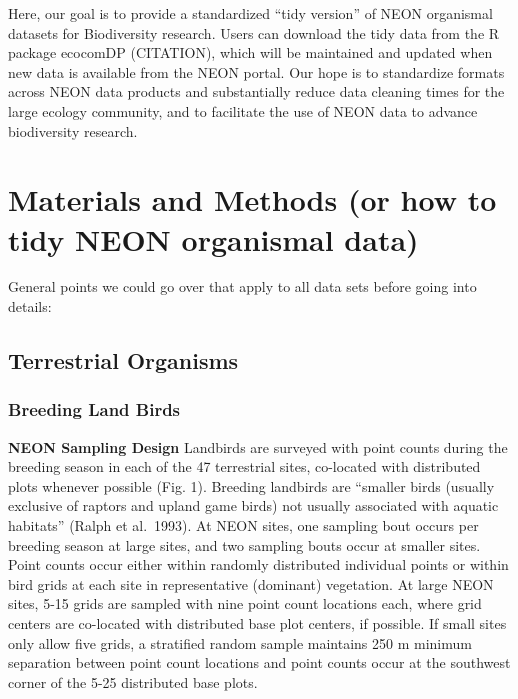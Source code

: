 \documentclass[
  12pt,
]{article}
\begin{document}
Here, our goal is to provide a standardized ``tidy version'' of NEON organismal datasets for Biodiversity research. Users can download the tidy data from the R package ecocomDP (CITATION), which will be maintained and updated when new data is available from the NEON portal. Our hope is to standardize formats across NEON data products and substantially reduce data cleaning times for the large ecology community, and to facilitate the use of NEON data to advance biodiversity research.

\hypertarget{materials-and-methods-or-how-to-tidy-neon-organismal-data}{%
\section{Materials and Methods (or how to tidy NEON organismal data)}\label{materials-and-methods-or-how-to-tidy-neon-organismal-data}}

General points we could go over that apply to all data sets before going into details:

\hypertarget{terrestrial-organisms}{%
\subsection{Terrestrial Organisms}\label{terrestrial-organisms}}

\hypertarget{breeding-land-birds}{%
\subsubsection{Breeding Land Birds}\label{breeding-land-birds}}

\textbf{NEON Sampling Design} Landbirds are surveyed with point counts during the breeding season in each of the 47 terrestrial sites, co-located with distributed plots whenever possible (Fig. 1). Breeding landbirds are ``smaller birds (usually exclusive of raptors and upland game birds) not usually associated with aquatic habitats'' (Ralph et al.~1993). At NEON sites, one sampling bout occurs per breeding season at large sites, and two sampling bouts occur at smaller sites. Point counts occur either within randomly distributed individual points or within bird grids at each site in representative (dominant) vegetation. At large NEON sites, 5-15 grids are sampled with nine point count locations each, where grid centers are co-located with distributed base plot centers, if possible. If small sites only allow five grids, a stratified random sample maintains 250 m minimum separation between point count locations and point counts occur at the southwest corner of the 5-25 distributed base plots.
\end{document}
